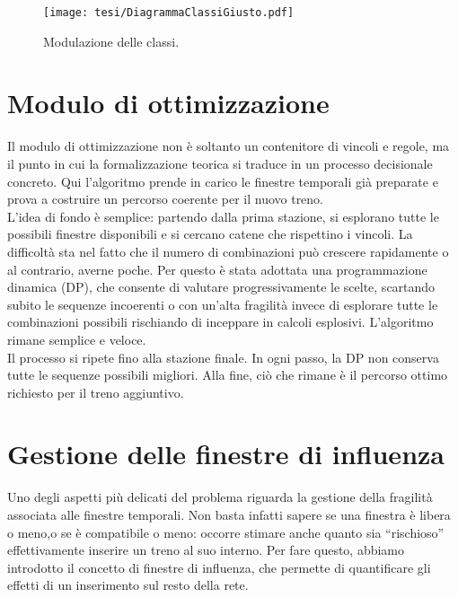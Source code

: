 \documentclass{report}
\begin{document}
\begin{figure}[H]  %
  
  \texttt{[image: tesi/DiagrammaClassiGiusto.pdf]}
  \caption{Modulazione delle classi.}
  \label{fig:placeholder}
\end{figure}

\section{Modulo di ottimizzazione}
Il modulo di ottimizzazione non è soltanto un contenitore di vincoli e regole, ma il punto in cui la formalizzazione teorica si traduce in un processo decisionale concreto. Qui l’algoritmo prende in carico le finestre temporali già preparate e prova a costruire un percorso coerente per il nuovo treno. \\ 
L’idea di fondo è semplice: partendo dalla prima stazione, si esplorano tutte le possibili finestre disponibili e si cercano catene che rispettino i vincoli. La difficoltà sta nel fatto che il numero di combinazioni può crescere rapidamente o al contrario, averne poche. Per questo è stata adottata una programmazione dinamica (DP), che consente di valutare progressivamente le scelte, scartando subito le sequenze incoerenti o con un'alta fragilità invece di esplorare tutte le combinazioni possibili rischiando di inceppare in calcoli esplosivi. L’algoritmo rimane semplice e veloce. \\
Il processo si ripete fino alla stazione finale. In ogni passo, la DP non conserva tutte le sequenze possibili migliori. Alla fine, ciò che rimane è il percorso ottimo richiesto per il treno aggiuntivo.


\section{Gestione delle finestre di influenza}

Uno degli aspetti più delicati del problema riguarda la gestione della fragilità associata alle finestre temporali. Non basta infatti sapere se una finestra è libera o meno,o se è compatibile o meno: occorre stimare anche quanto sia “rischioso” effettivamente inserire un treno al suo interno. Per fare questo, abbiamo introdotto il concetto di finestre di influenza, che permette di quantificare gli effetti di un inserimento sul resto della rete.
\end{document}
